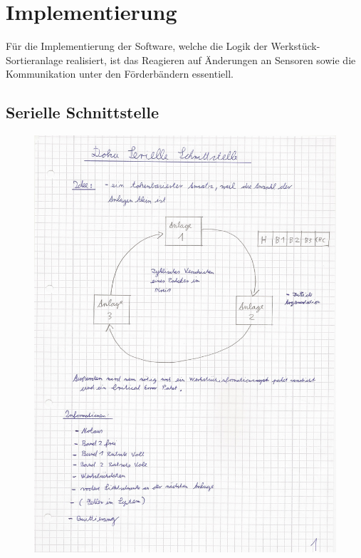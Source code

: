 \documentclass[a4paper, 11pt]{article}
\begin{document}
\label{sec:hsm3}

\newpage



\setcounter{imgcounter}{10}


\section{Implementierung}
Für die Implementierung der Software, welche die Logik der Werkstück-Sortieranlage realisiert, ist das Reagieren auf Änderungen an Sensoren sowie die Kommunikation unter den Förderbändern essentiell.

\subsection{Serielle Schnittstelle}
\begin{figure}[H]
\centering 
    \includegraphics[scale=0.69]{SI/si1.jpg}
    \label{si1}
\end{figure}
\end{document}
